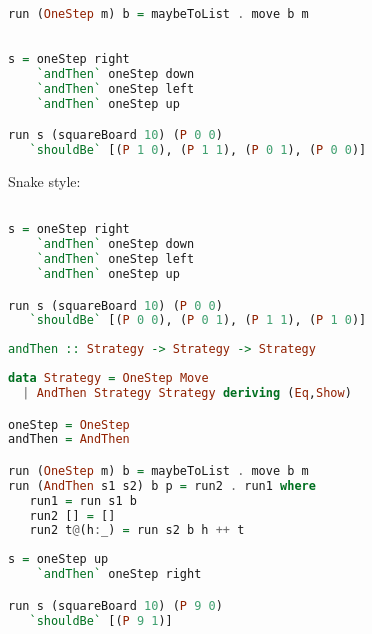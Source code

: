 \documentclass[10pt]{beamer}
\begin{document}
\begin{frame}[fragile]
\begin{lstlisting}[language=haskell, basicstyle=\ttfamily]

run (OneStep m) b = maybeToList . move b m
\end{lstlisting}
\end{frame}
\begin{frame}[fragile]
\begin{lstlisting}[language=haskell, basicstyle=\ttfamily]

s = oneStep right
    `andThen` oneStep down
    `andThen` oneStep left
    `andThen` oneStep up

run s (squareBoard 10) (P 0 0)
   `shouldBe` [(P 1 0), (P 1 1), (P 0 1), (P 0 0)]
\end{lstlisting}
\end{frame}
\begin{frame}[fragile]
  Snake style:
\begin{lstlisting}[language=haskell, basicstyle=\ttfamily]

s = oneStep right
    `andThen` oneStep down
    `andThen` oneStep left
    `andThen` oneStep up

run s (squareBoard 10) (P 0 0)
   `shouldBe` [(P 0 0), (P 0 1), (P 1 1), (P 1 0)]
\end{lstlisting}
\end{frame}

\begin{frame}[fragile]
\begin{lstlisting}[language=haskell, basicstyle=\ttfamily]
andThen :: Strategy -> Strategy -> Strategy
\end{lstlisting}
\end{frame}

\begin{frame}[fragile]
\begin{lstlisting}[language=haskell, basicstyle=\ttfamily]
data Strategy = OneStep Move 
  | AndThen Strategy Strategy deriving (Eq,Show)

oneStep = OneStep
andThen = AndThen

run (OneStep m) b = maybeToList . move b m
run (AndThen s1 s2) b p = run2 . run1 where 
   run1 = run s1 b 
   run2 [] = [] 
   run2 t@(h:_) = run s2 b h ++ t 
\end{lstlisting}
\end{frame}
\begin{frame}[fragile]
\begin{lstlisting}[language=haskell, basicstyle=\ttfamily]
s = oneStep up
    `andThen` oneStep right

run s (squareBoard 10) (P 9 0)
   `shouldBe` [(P 9 1)]
\end{lstlisting}
\end{frame}
\end{document}
